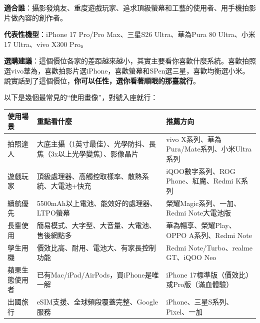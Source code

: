 
\textbf{適合誰}：攝影發燒友、重度遊戲玩家、追求頂級螢幕和工藝的使用者、用手機拍影片做內容的創作者。

\textbf{代表性機型}：iPhone 17 Pro/Pro Max、三星S26 Ultra、華為Pura 80 Ultra、小米17 Ultra、vivo X300 Pro。

\textbf{選購建議}：這個價位各家的差距越來越小，其實主要看你喜歡什麼系統。喜歡拍照選vivo華為，喜歡拍影片選iPhone，喜歡螢幕和SPen選三星，喜歡均衡選小米。說實話到了這個價位，\textbf{你可以任性，選你看著順眼的那臺就行}。


以下是幾個最常見的“使用畫像”，對號入座就行：

\begin{center}
\begin{tabularx}{\linewidth}{|X|X|X|}
\hline
\textbf{使用場景} & \textbf{重點看什麼} & \textbf{推薦方向} \tabularnewline
\hline
拍照達人 & 大底主攝（1英寸最佳）、光學防抖、長焦（3x以上光學變焦）、影像晶片 & vivo X系列、華為Pura/Mate系列、小米Ultra系列 \tabularnewline
遊戲玩家 & 頂級處理器、高觸控取樣率、散熱系統、大電池+快充 & iQOO數字系列、ROG Phone、紅魔、Redmi K系列 \tabularnewline
續航優先 & 5500mAh以上電池、能效好的處理器、LTPO螢幕 & 榮耀Magic系列、一加、Redmi Note大電池版 \tabularnewline
長輩使用 & 簡易模式、大字型、大音量、大電池、售後網點多 & 華為暢享、榮耀Play、OPPO A系列、Redmi Note \tabularnewline
學生用機 & 價效比高、耐用、電池大、有家長控制功能 & Redmi Note/Turbo、realme GT、iQOO Neo \tabularnewline
蘋果生態使用者 & 已有Mac/iPad/AirPods，買iPhone是唯一解 & iPhone 17標準版（價效比）或Pro版（滿血體驗） \tabularnewline
出國旅行 & eSIM支援、全球頻段覆蓋完整、Google服務 & iPhone、三星S系列、Pixel、一加 \tabularnewline
\hline
\end{tabularx}
\end{center}


